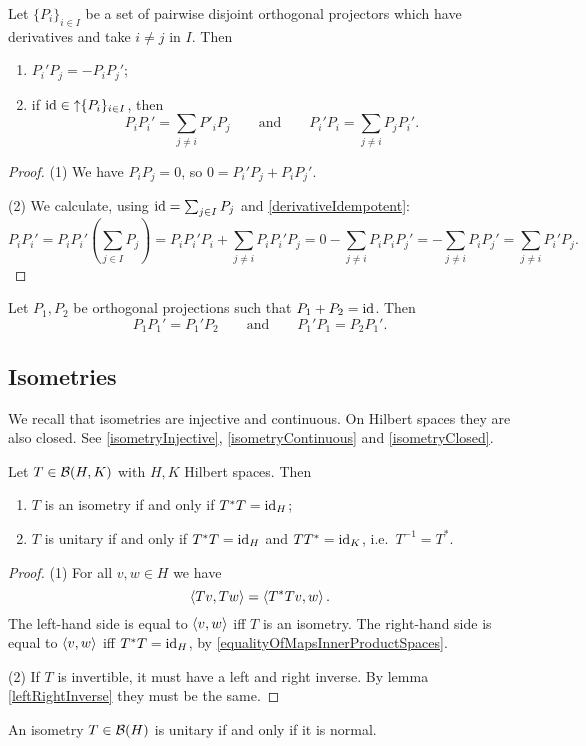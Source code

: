 \begin{proposition}
Let $\{P_i\}_{i\in I}$ be a set of pairwise disjoint orthogonal projectors which have derivatives and take $i\neq j$ in $I$. Then
\begin{enumerate}
\item $P_i'P_j = - P_iP_j'$;
\item if $\operatorname{id} \in \operatorname{\uparrow} \{P_i\}_{i\in I}$, then
\[ P_iP_i' = \sum_{j\neq i}P'_iP_j \qquad\text{and}\qquad P_i'P_i = \sum_{j\neq i}P_jP_i'. \]
\end{enumerate}
\end{proposition}
\begin{proof}
(1) We have $P_iP_j = 0$, so $0 = P_i'P_j + P_iP_j'$.

(2) We calculate, using $\operatorname{id} = \sum_{j\in I}P_j$ and \ref{derivativeIdempotent}:
\[ P_iP_i' = P_iP_i'\left(\sum_{j\in I}P_j\right) = P_iP_i'P_i + \sum_{j\neq i}P_iP_i'P_j = 0 - \sum_{j\neq i}P_iP_iP_j' = -\sum_{j\neq i}P_iP_j' = \sum_{j\neq i}P_i'P_j. \]
\end{proof}
\begin{corollary}
Let $P_1, P_2$ be orthogonal projections such that $P_1 + P_2 = \operatorname{id}$. Then
\[ P_1P_1'= P_1'P_2 \qquad \text{and}\qquad P_1'P_1 = P_2P_1'. \]
\end{corollary}


\subsection{Isometries}
We recall that isometries are injective and continuous. On Hilbert spaces they are also closed. See \ref{isometryInjective}, \ref{isometryContinuous} and \ref{isometryClosed}.

\begin{proposition} \label{isometryCharacterisation}
Let $T\in \operatorname{\mathcal{B}}(H,K)$ with $H,K$ Hilbert spaces. Then
\begin{enumerate}
\item $T$ is an isometry \textup{if and only if} $T^*T = \operatorname{id}_H$;
\item $T$ is unitary \textup{if and only if} $T^*T = \operatorname{id}_H$ and $TT^* = \operatorname{id}_K$, i.e.\ $T^{-1} = T^*$.
\end{enumerate}
\end{proposition}
\begin{proof}
(1) For all $v,w\in H$ we have
\[ \left\langle Tv,Tw \right\rangle = \left\langle T^*Tv,w \right\rangle. \]
The left-hand side is equal to $\left\langle v,w \right\rangle$ iff $T$ is an isometry. The right-hand side is equal to $\left\langle v,w \right\rangle$ iff $T^*T = \operatorname{id}_H$, by \ref{equalityOfMapsInnerProductSpaces}.

(2) If $T$ is invertible, it must have a left and right inverse. By lemma \ref{leftRightInverse} they must be the same.
\end{proof}
\begin{corollary}
An isometry $T\in\operatorname{\mathcal{B}}(H)$ is unitary \textup{if and only if} it is normal.
\end{corollary}

